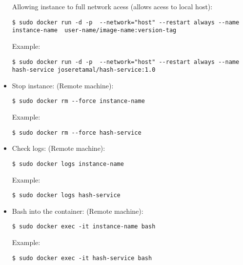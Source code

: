 \begin{itemize}
\subitem Allowing instance to full network acess (allows acess to local host):
\begin{verbatim}
$ sudo docker run -d -p  --network="host" --restart always --name instance-name  user-name/image-name:version-tag 
\end{verbatim}
Example:
\begin{verbatim}
$ sudo docker run -d -p  --network="host" --restart always --name hash-service joseretamal/hash-service:1.0 
\end{verbatim}

\item Stop instance: (Remote machine):

\begin{verbatim}
$ sudo docker rm --force instance-name
\end{verbatim}
Example:
\begin{verbatim}
$ sudo docker rm --force hash-service
\end{verbatim}

\item Check logs: (Remote machine):

\begin{verbatim}
$ sudo docker logs instance-name
\end{verbatim}
Example:
\begin{verbatim}
$ sudo docker logs hash-service
\end{verbatim}

\item Bash into the container: (Remote machine):

\begin{verbatim}
$ sudo docker exec -it instance-name bash
\end{verbatim}
Example:
\begin{verbatim}
$ sudo docker exec -it hash-service bash
\end{verbatim}

\end{itemize}
	